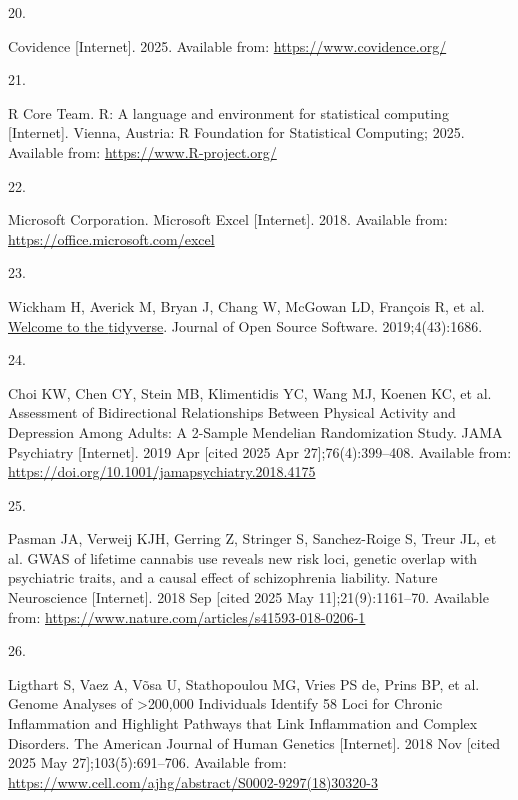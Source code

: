 \documentclass[
]{article}
\newlength{\cslhangindent}
\newlength{\csllabelwidth}
\newenvironment{CSLReferences}[2] %
 {\begin{list}{}{%
  \setlength{\itemindent}{0pt}
  \setlength{\leftmargin}{0pt}
  \setlength{\parsep}{0pt}
  \ifodd #1
   \setlength{\leftmargin}{\cslhangindent}
   \setlength{\itemindent}{-1\cslhangindent}
  \fi
  \setlength{\itemsep}{#2\baselineskip}}}
 {\end{list}}
\newcommand{\CSLLeftMargin}[1]{\parbox[t]{\csllabelwidth}{\strut#1\strut}}
\newcommand{\CSLRightInline}[1]{\parbox[t]{\linewidth - \csllabelwidth}{\strut#1\strut}}
\begin{document}
\begin{CSLReferences}{0}{1}
\CSLLeftMargin{20. }%
\CSLRightInline{Covidence {[}Internet{]}. 2025. Available from: \url{https://www.covidence.org/}}

\CSLLeftMargin{21. }%
\CSLRightInline{R Core Team. {R}: A language and environment for statistical computing {[}Internet{]}. Vienna, Austria: R Foundation for Statistical Computing; 2025. Available from: \url{https://www.R-project.org/}}

\CSLLeftMargin{22. }%
\CSLRightInline{Microsoft Corporation. Microsoft {Excel} {[}Internet{]}. 2018. Available from: \url{https://office.microsoft.com/excel}}

\CSLLeftMargin{23. }%
\CSLRightInline{Wickham H, Averick M, Bryan J, Chang W, McGowan LD, François R, et al. \href{https://doi.org/10.21105/joss.01686}{Welcome to the {tidyverse}}. Journal of Open Source Software. 2019;4(43):1686. }

\CSLLeftMargin{24. }%
\CSLRightInline{Choi KW, Chen CY, Stein MB, Klimentidis YC, Wang MJ, Koenen KC, et al. Assessment of {Bidirectional} {Relationships} {Between} {Physical} {Activity} and {Depression} {Among} {Adults}: {A} 2-{Sample} {Mendelian} {Randomization} {Study}. JAMA Psychiatry {[}Internet{]}. 2019 Apr {[}cited 2025 Apr 27{]};76(4):399--408. Available from: \url{https://doi.org/10.1001/jamapsychiatry.2018.4175}}

\CSLLeftMargin{25. }%
\CSLRightInline{Pasman JA, Verweij KJH, Gerring Z, Stringer S, Sanchez-Roige S, Treur JL, et al. {GWAS} of lifetime cannabis use reveals new risk loci, genetic overlap with psychiatric traits, and a causal effect of schizophrenia liability. Nature Neuroscience {[}Internet{]}. 2018 Sep {[}cited 2025 May 11{]};21(9):1161--70. Available from: \url{https://www.nature.com/articles/s41593-018-0206-1}}

\CSLLeftMargin{26. }%
\CSLRightInline{Ligthart S, Vaez A, Võsa U, Stathopoulou MG, Vries PS de, Prins BP, et al. Genome {Analyses} of {\textgreater{}}200,000 {Individuals} {Identify} 58 {Loci} for {Chronic} {Inflammation} and {Highlight} {Pathways} that {Link} {Inflammation} and {Complex} {Disorders}. The American Journal of Human Genetics {[}Internet{]}. 2018 Nov {[}cited 2025 May 27{]};103(5):691--706. Available from: \url{https://www.cell.com/ajhg/abstract/S0002-9297(18)30320-3}}


\end{CSLReferences}
\end{document}
